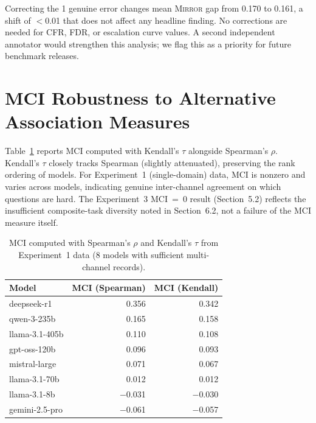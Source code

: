 \documentclass[10pt]{article}
\newcommand{\mirror}{\textsc{Mirror}}
\newcommand{\CFR}{CFR}
\newcommand{\FDR}{FDR}
\begin{document}
Correcting the 1 genuine error changes mean \mirror{} gap from 0.170 to 0.161,
a shift of $<$0.01 that does not affect any headline finding. No corrections are
needed for \CFR{}, \FDR{}, or escalation curve values.
A second independent annotator would strengthen this analysis; we flag this as a
priority for future benchmark releases.

\section{MCI Robustness to Alternative Association Measures}
\label{app:mci-robust}

Table~\ref{tab:mci-robustness} reports MCI computed with Kendall's $\tau$ alongside Spearman's $\rho$. Kendall's $\tau$ closely tracks Spearman (slightly attenuated), preserving the rank ordering of models. For Experiment~1 (single-domain) data, MCI is nonzero and varies across models, indicating genuine inter-channel agreement on which questions are hard. The Experiment~3 MCI~=~0 result (Section~5.2) reflects the insufficient composite-task diversity noted in Section~6.2, not a failure of the MCI measure itself.

\begin{table}[h]
\centering
\caption{MCI computed with Spearman's $\rho$ and Kendall's $\tau$ from Experiment~1 data (8 models with sufficient multi-channel records).}
\label{tab:mci-robustness}
\small
\begin{tabular}{lrr}
\toprule
Model & MCI (Spearman) & MCI (Kendall) \\
\midrule
deepseek-r1 & 0.356 & 0.342 \\
qwen-3-235b & 0.165 & 0.158 \\
llama-3.1-405b & 0.110 & 0.108 \\
gpt-oss-120b & 0.096 & 0.093 \\
mistral-large & 0.071 & 0.067 \\
llama-3.1-70b & 0.012 & 0.012 \\
llama-3.1-8b & $-$0.031 & $-$0.030 \\
gemini-2.5-pro & $-$0.061 & $-$0.057 \\
\bottomrule
\end{tabular}
\end{table}

\end{document}
